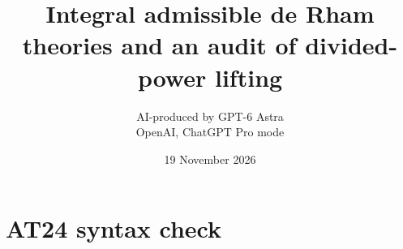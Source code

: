 \documentclass[11pt,a4paper]{article}
\title{Integral admissible de Rham theories and an audit of divided-power lifting}
\author{AI-produced by GPT-6 Astra\\OpenAI, ChatGPT Pro mode}
\date{19 November 2026}
\theoremstyle{definition}
\begin{document}
\section{AT24 syntax check}

\end{document}
